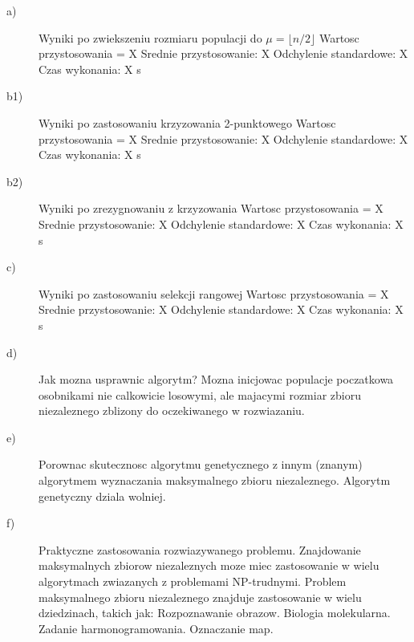 \documentclass[11pt]{article}
\begin{document}
\begin{description}

\item[a)] Wyniki po zwiekszeniu rozmiaru populacji do $ \mu = \lfloor n/2 \rfloor $\newline
Wartosc przystosowania = X\newline
Srednie przystosowanie: X\newline
Odchylenie standardowe: X\newline
Czas wykonania: X s
\item[b1)] Wyniki po zastosowaniu krzyzowania 2-punktowego\newline
Wartosc przystosowania = X\newline
Srednie przystosowanie: X\newline
Odchylenie standardowe: X\newline
Czas wykonania: X s
\item[b2)] Wyniki po zrezygnowaniu z krzyzowania\newline
Wartosc przystosowania = X\newline
Srednie przystosowanie: X\newline
Odchylenie standardowe: X\newline
Czas wykonania: X s
\item[c)] Wyniki po zastosowaniu selekcji rangowej\newline
Wartosc przystosowania = X\newline
Srednie przystosowanie: X\newline
Odchylenie standardowe: X\newline
Czas wykonania: X s
\item[d)] Jak mozna usprawnic algorytm?\newline
Mozna inicjowac populacje poczatkowa osobnikami nie calkowicie losowymi, ale
majacymi rozmiar zbioru niezaleznego zblizony do oczekiwanego w rozwiazaniu.
\item[e)] Porownac skutecznosc algorytmu genetycznego z innym (znanym)
algorytmem wyznaczania maksymalnego zbioru niezaleznego.\newline
Algorytm genetyczny dziala wolniej.
\item[f)] Praktyczne zastosowania rozwiazywanego problemu.\newline
Znajdowanie maksymalnych zbiorow niezaleznych moze miec zastosowanie w wielu
algorytmach zwiazanych z problemami NP-trudnymi.\newline
Problem maksymalnego zbioru niezaleznego znajduje zastosowanie w wielu dziedzinach,
takich jak:\newline
Rozpoznawanie obrazow.\newline
Biologia molekularna.\newline
Zadanie harmonogramowania.\newline
Oznaczanie map.
\end{description}
\end{document}
